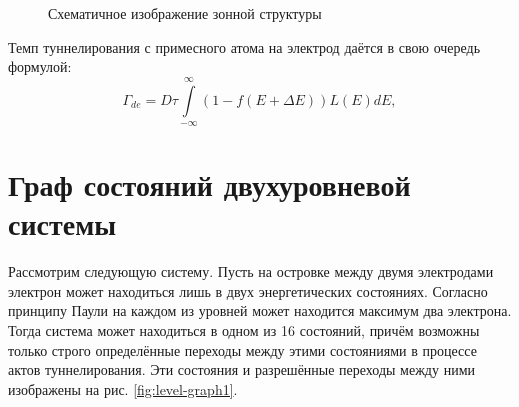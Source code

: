 \documentclass[12pt,a4paper]{report}
\begin{document}
\begin{figure}[h]
	\caption{Схематичное изображение зонной структуры}
	\label{fig:SASET model}
\end{figure}

Темп туннелирования с примесного атома на электрод даётся в свою очередь формулой:
\begin{equation}\label{eq4}
\Gamma_{de} = D\tau \int\limits_{-\infty}^{\infty}(1 - f(E + \Delta E))L(E) dE,
\end{equation}

\section{Граф состояний двухуровневой системы}
Рассмотрим следующую систему. Пусть на островке между двумя электродами электрон может находиться лишь в двух энергетических состояниях. Согласно принципу Паули на каждом из уровней может находится максимум два электрона. Тогда система может находиться в одном из 16 состояний, причём возможны только строго определённые переходы между этими состояниями в процессе актов туннелирования. Эти состояния и разрешённые переходы между ними изображены на рис. \ref{fig:level-graph1}.
\end{document}
